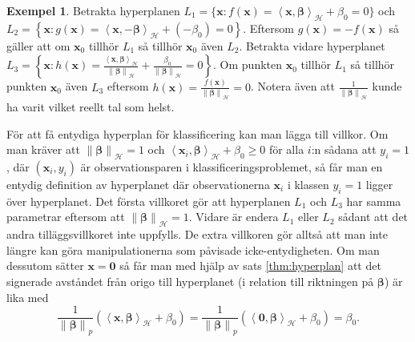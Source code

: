 \documentclass[a4paper, 12pt]{report}
\theoremstyle{definition}
\newtheorem{ex}{Exempel}[section]
\theoremstyle{remark}
\newcommand{\bfbeta}{{\boldsymbol{\beta}}}
\newcommand{\bfx}{\mathbf{x}}
\newcommand{\llangle}{\left\langle}
\newcommand{\rrangle}{\right\rangle}
\newcommand{\sephyp}{\{ \mathbf{x} : f\left(\mathbf{x}\right)=\inner{\bfx}{\bfbeta}_\mathcal{H} + \beta_0=0\}}
\newcommand{\inner}[2]{\llangle #1, #2 \rrangle}
\newcommand{\hil}{\mathcal{H}}
\begin{document}
\begin{ex}\label{ex:entydig}
	Betrakta hyperplanen $L_1 = \sephyp$ och $L_2 = \left\{\mathbf{x}: g\left(\mathbf{x}\right)=\inner{\bfx}{-\bfbeta}_\hil + \left(-\beta_0\right) = 0\right\}$. Eftersom $g\left(\mathbf{x}\right) = -f\left(\mathbf{x}\right)$ så gäller att om $\mathbf{x}_0$ tillhör $L_1$ så tillhör $\mathbf{x}_0$ även $L_2$.
	Betrakta vidare hyperplanet $L_3= \left\{\mathbf{x}: h\left(\mathbf{x}\right)=\frac{\inner{\bfx}{\bfbeta}_\hil}{\left\|\bfbeta
		\right\|_\hil} + \frac{\beta_0}{\left\|\bfbeta
		\right\|_\hil}=0\right\}$. Om punkten $\mathbf{x}_0$ tillhör $L_1$ så tillhör punkten $\mathbf{x}_0$ även $L_3$ eftersom $h\left(\mathbf{x}\right) = \frac{f\left(\mathbf{x}\right)}{\left\|\bfbeta
		\right\|_\hil}=0$. Notera även att $\frac{1}{\left\|\bfbeta
		\right\|_\hil}$ kunde ha varit vilket reellt tal som helst.
\end{ex}


	För att få entydiga hyperplan för klassificering kan man lägga till villkor. Om man kräver att $\left\|\bfbeta\right\|_\hil=1$ och $\inner{\bfx_i}{\bfbeta}_\hil + \beta_0\geq0$ för alla $i$:n sådana att $y_i=1$, där $\left(\bfx_i, y_i\right)$ är observationsparen i klassificeringsproblemet, så får man en entydig definition av hyperplanet där observationerna $\bfx_i$ i klassen $y_i=1$ ligger över hyperplanet.
	Det första villkoret gör att hyperplanen $L_1$ och $L_3$ har samma parametrar eftersom att $\left\|\bfbeta\right\|_\hil=1$. Vidare är endera $L_1$ eller $L_2$ sådant att det andra tilläggsvillkoret inte uppfylls.
	De extra villkoren gör alltså att man inte längre kan göra manipulationerna som påvisade icke-entydigheten. Om man dessutom sätter $\mathbf{x}=\mathbf{0}$ så får man med hjälp av sats \ref{thm:hyperplan} att det signerade avståndet från origo till hyperplanet (i relation till riktningen på $\bfbeta$) är lika med
	\begin{equation*}
	\frac{1}{\left\|\bfbeta
		\right\|_p}\left(\inner{\bfx}{\bfbeta}_\hil+\beta_0\right)=\frac{1}{\left\|\bfbeta
		\right\|_p}\left(\inner{\mathbf{0}}{\bfbeta}_\hil+\beta_0\right)=\beta_0.
	\end{equation*}
\end{document}
